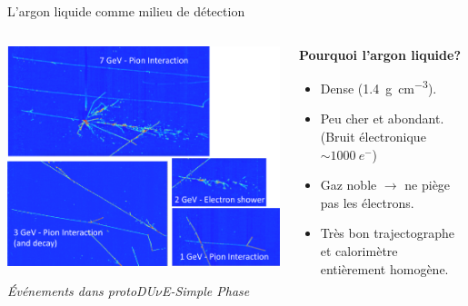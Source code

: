           \begin{frame}{L'argon liquide comme milieu de détection}
         	  \begin{scriptsize}
               	\begin{columns}
               		\begin{column}{0.6\textwidth}
               			\centering
               			\includegraphics[width=\textwidth]{./pictures/SP_evt.png}\\
               			\flushleft
               			\begin{footnotesize}\textit{Événements dans protoDU$\nu$E-Simple Phase}\end{footnotesize}
               		\end{column}
               		\begin{column}{0.4\textwidth}
               			\begin{footnotesize}
               				\textbf{Pourquoi l'argon liquide?}
               			\end{footnotesize}
               			\begin{itemize}
               				\item Dense (\SI{1.4}{\gram\per\centi\meter^3}).
               				\item Peu cher et abondant.
               				(Bruit électronique $\sim \SI{1000}{e^-}$)
               				\item Gaz noble $\rightarrow$ ne piège pas les électrons.
               				\item Très bon trajectographe et calorimètre entièrement homogène.

\end{itemize}
\end{column}
\end{columns}
\end{scriptsize}
\end{frame}
